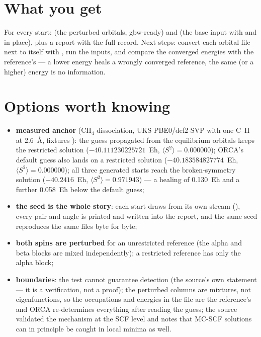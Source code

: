 \section{What you get}

For every start:  (the perturbed orbitals,
gbw-ready) and  (the base input with 
and  in place), plus a report
 with the full record.  Next steps: convert each
orbital file next to itself with , run the
inputs, and compare the converged energies with the reference's --- a lower
energy heals a wrongly converged reference, the same (or a higher) energy is
no information.

\section{Options worth knowing}

\begin{readbox}
\begin{itemize}
  \item \textbf{measured anchor} (CH$_4$ dissociation, UKS PBE0/def2-SVP
    with one C--H at 2.6~\AA, fixtures ): the guess propagated
    from the equilibrium orbitals keeps the restricted solution
    ($-40.111230225721$~Eh, $\langle S^2\rangle = 0.000000$); ORCA's default
    guess also lands on a restricted solution
    ($-40.183584827774$~Eh, $\langle S^2\rangle = 0.000000$); all three
    generated starts reach the broken-symmetry solution
    ($-40.2416$~Eh, $\langle S^2\rangle = 0.971943$) --- a healing of
    0.130~Eh and a further 0.058~Eh below the default guess;
  \item \textbf{the seed is the whole story}: each start draws from its own
    stream (), every pair and angle is printed and
    written into the report, and the same seed reproduces the same files
    byte for byte;
  \item \textbf{both spins are perturbed} for an unrestricted reference
    (the alpha and beta blocks are mixed independently); a restricted
    reference has only the alpha block;
  \item \textbf{boundaries}: the test cannot guarantee detection (the
    source's own statement --- it is a verification, not a proof); the
    perturbed columns are mixtures, not eigenfunctions, so the occupations
    and energies in the file are the reference's and ORCA re-determines
    everything after reading the guess; the source validated the mechanism
    at the SCF level and notes that MC-SCF solutions can in principle be
    caught in local minima as well.
\end{itemize}
\end{readbox}
